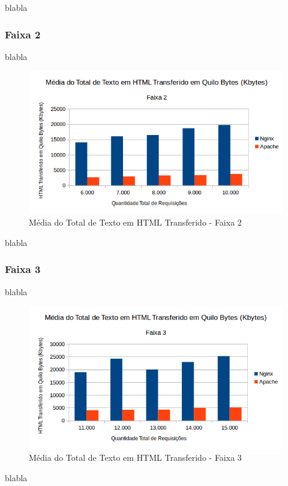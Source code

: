 blabla

\subsubsection{Faixa 2}
blabla

\begin{figure}[H]
	\centering
	\includegraphics[width=0.6\linewidth]{graficos/grafico3-f2} 
	\caption{Média do Total de Texto em HTML Transferido - Faixa 2}
	\label{fig:grafico3-f2}
\end{figure}
blabla

\subsubsection{Faixa 3}
blabla

\begin{figure}[H]
	\centering
	\includegraphics[width=0.6\linewidth]{graficos/grafico3-f3} 
	\caption{Média do Total de Texto em HTML Transferido - Faixa 3}
	\label{fig:grafico3-f3}
\end{figure}
blabla
